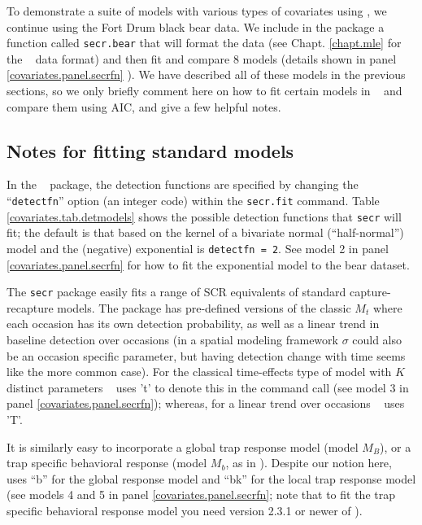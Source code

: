 To demonstrate
a suite of models with various types of covariates using \secr, we
continue using the Fort Drum black bear data. 
We include in the \scrbook package a function called {\tt secr.bear}
that will format the data (see Chapt. \ref{chapt.mle} for the \secr~
data format) and then fit and compare 8 models (details shown in panel
\ref{covariates.panel.secrfn} ).  We have described all of these
models in the previous sections, so we only briefly comment here on
how to fit certain models in \secr~ and compare them using AIC, and
give a few helpful notes.

\subsection{Notes for fitting standard models}

In the \secr~ package, the detection functions are specified
by changing the ``\mbox{\tt detectfn}'' option (an integer code)
within the \mbox{\tt secr.fit} command.  Table
\ref{covariates.tab.detmodels} shows the possible detection functions
that \mbox{\tt secr} will fit; the default is that based on the kernel
of a bivariate normal
(``half-normal'') model and the
(negative) exponential is \mbox{\tt detectfn = 2}.  See model 2 in 
panel \ref{covariates.panel.secrfn} for how to fit the exponential 
model to the bear dataset. 

The \mbox{\tt secr} package easily fits a range of SCR equivalents of standard capture-recapture models.
The package has pre-defined versions of the classic
$M_{t}$ where each
occasion has its own detection probability, as well as a linear
trend in baseline detection over occasions (in a spatial modeling framework $\sigma$ could also be an occasion specific parameter, but having detection change with time seems like the more common case). For the classical
time-effects type of model with $K$ distinct parameters \secr~ uses 't' to denote
this in the command call (see model 3 in 
panel \ref{covariates.panel.secrfn}); whereas, for a linear
trend over occasions \secr~ uses 'T'.

It is similarly easy to incorporate a global trap response model (model $M_{B}$), 
or a trap specific behavioral response (model $M_{b}$, as in
\citet{royle_etal:2009}). Despite our notion here, \secr~ uses ``b'' for the global response model and
 ``bk'' for the local trap response model
(see models 4 and 5 in 
panel \ref{covariates.panel.secrfn}; note that to fit the trap specific behavioral response model you need version 2.3.1 or newer of \secr).

